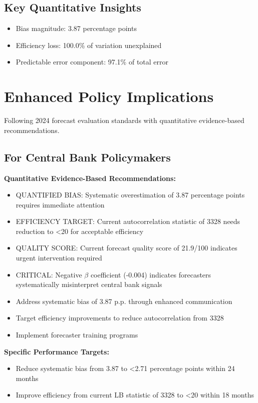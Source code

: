 \documentclass[11pt,a4paper]{article}
\begin{document}
\subsection{Key Quantitative Insights}
\begin{itemize}
    \item Bias magnitude: 3.87 percentage points
    \item Efficiency loss: 100.0\% of variation unexplained
    \item Predictable error component: 97.1\% of total error
\end{itemize}

\section{Enhanced Policy Implications}

Following 2024 forecast evaluation standards with quantitative evidence-based recommendations.

\subsection{For Central Bank Policymakers}
\textbf{Quantitative Evidence-Based Recommendations:}

\begin{itemize}
\item QUANTIFIED BIAS: Systematic overestimation of 3.87 percentage points requires immediate attention
\item EFFICIENCY TARGET: Current autocorrelation statistic of 3328 needs reduction to <20 for acceptable efficiency
\item QUALITY SCORE: Current forecast quality score of 21.9/100 indicates urgent intervention required
\item CRITICAL: Negative $\beta$ coefficient (-0.004) indicates forecasters systematically misinterpret central bank signals
\item Address systematic bias of 3.87 p.p. through enhanced communication
\item Target efficiency improvements to reduce autocorrelation from 3328
\item Implement forecaster training programs
\end{itemize}

\textbf{Specific Performance Targets:}
\begin{itemize}
\item Reduce systematic bias from 3.87 to <2.71 percentage points within 24 months
\item Improve efficiency from current LB statistic of 3328 to <20 within 18 months
\end{itemize}
\end{document}
